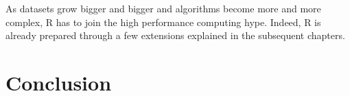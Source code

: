As datasets grow bigger and bigger and algorithms become more and more
complex, R has to join the high performance computing hype. Indeed, R
is already prepared through a few extensions explained in the
subsequent chapters.







%

\section{Conclusion}

